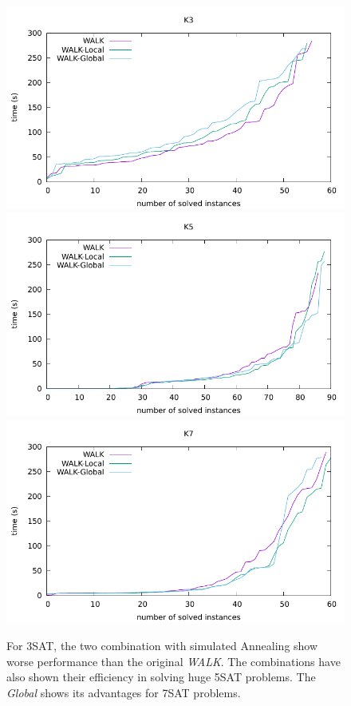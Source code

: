 \documentclass[12pt,a4paper,twoside]{scrartcl}
\numberwithin{equation}{section}
\begin{document}
\begin{figure}[H]
\begin{center}
  \includegraphics[scale = 0.8]{DATA/K3/e3w.pdf}
  \includegraphics[scale = 0.8]{DATA/K5/e3w.pdf} 
  \includegraphics[scale = 0.8]{DATA/K7/e3w.pdf} 
  \caption{For 3SAT, the two combination with simulated Annealing show worse performance than the original \emph{WALK}. The combinations  have also shown their  efficiency in solving huge 5SAT problems. The \emph{Global} shows its advantages for 7SAT problems.
}
  \end{center}
  \label{Experiment 3 WALK cactus plot}
  \end{figure}
\end{document}
